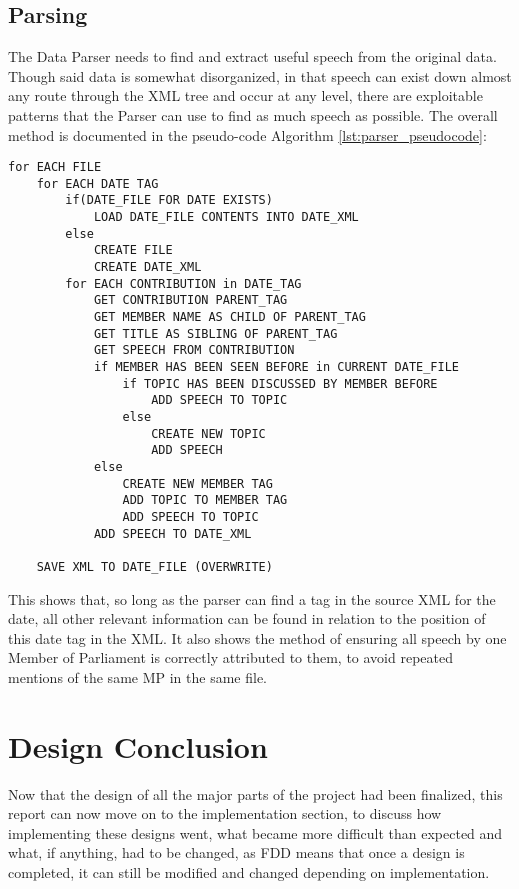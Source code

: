 \subsection{Parsing}
\label{sec:des_Parsing_algorithm}
The Data Parser needs to find and extract useful speech from the original data. Though said data is somewhat disorganized, in that speech can exist down almost any route through the XML tree and occur at any level, there are exploitable patterns that the Parser can use to find as much speech as possible. The overall method is documented in the pseudo-code Algorithm \ref{lst:parser_pseudocode}:
\begin{lstlisting}[float=ht, caption={Data Parser Pseudo-code}, label={lst:parser_pseudocode}]
for EACH FILE
    for EACH DATE TAG
    	if(DATE_FILE FOR DATE EXISTS)
        	LOAD DATE_FILE CONTENTS INTO DATE_XML
    	else
        	CREATE FILE
        	CREATE DATE_XML
    	for EACH CONTRIBUTION in DATE_TAG
        	GET CONTRIBUTION PARENT_TAG
        	GET MEMBER NAME AS CHILD OF PARENT_TAG
        	GET TITLE AS SIBLING OF PARENT_TAG
        	GET SPEECH FROM CONTRIBUTION
        	if MEMBER HAS BEEN SEEN BEFORE in CURRENT DATE_FILE
        	    if TOPIC HAS BEEN DISCUSSED BY MEMBER BEFORE
        			ADD SPEECH TO TOPIC
        		else
        			CREATE NEW TOPIC
        			ADD SPEECH
        	else
        		CREATE NEW MEMBER TAG
        		ADD TOPIC TO MEMBER TAG
        		ADD SPEECH TO TOPIC
        	ADD SPEECH TO DATE_XML

    SAVE XML TO DATE_FILE (OVERWRITE)
\end{lstlisting}

This shows that, so long as the parser can find a tag in the source XML for the date, all other relevant information can be found in relation to the position of this date tag in the XML. It also shows the method of ensuring all speech by one Member of Parliament is correctly attributed to them, to avoid repeated mentions of the same MP in the same file.

\section{Design Conclusion}
Now that the design of all the major parts of the project had been finalized, this report can now move on to the implementation section, to discuss how implementing these designs went, what became more difficult than expected and what, if anything, had to be changed, as FDD means that once a design is completed, it can still be modified and changed depending on implementation.